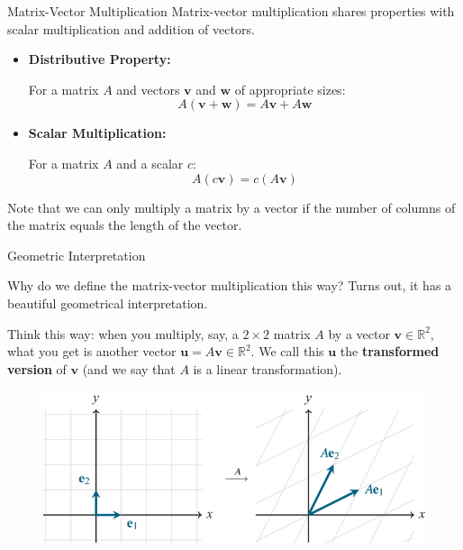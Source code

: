 \documentclass{beamer}
\newcommand{\vv}{\mathbf{v}}
\newcommand{\vu}{\mathbf{u}}
\newcommand{\R}{\mathbb{R}}
\begin{document}
\begin{frame}{Matrix-Vector Multiplication}
    Matrix-vector multiplication shares properties with scalar multiplication and addition of vectors.

 \begin{itemize}
       \item \textbf{Distributive Property:}

    For a matrix \(A\) and vectors \(\mathbf{v}\) and \(\mathbf{w}\) of appropriate sizes:
    \[
      A(\mathbf{v} + \mathbf{w}) = A\mathbf{v} + A\mathbf{w}
    \]
\item \textbf{Scalar Multiplication:}

    For a matrix \(A\) and a scalar \(c\):
    \[
      A(c\mathbf{v}) = c(A\mathbf{v})
    \]
  \end{itemize}
\pause
    Note that we can only multiply a matrix by a vector if the number of columns of the matrix equals the length of the vector.

\end{frame}




\begin{frame}{Geometric Interpretation }

Why do we define the matrix-vector multiplication this way? Turns out, it has a beautiful geometrical interpretation. \pause 

\bigskip

Think this way: when you multiply, say, a $2\times 2$ matrix $A$ by a vector $\vv\in\R^2$, what you get is another vector $\vu=A\vv\in\R^2$. We call this $\vu$ the \textbf{transformed version} of $\vv$ (and we say that $A$ is a linear transformation).

\begin{figure}
    \centering
    \includegraphics[width=0.75\linewidth]{viz ex.png}
    
    
\end{figure}

\end{frame}
\end{document}
